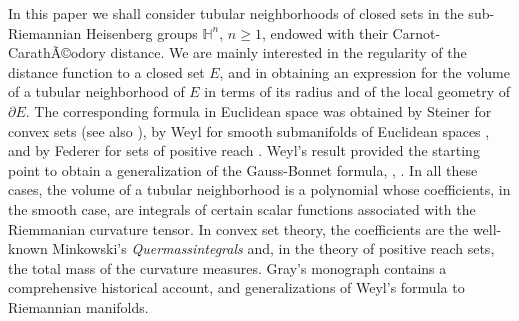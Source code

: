 \documentclass[10pt]{amsart}
\theoremstyle{definition}
\theoremstyle{remark}
\numberwithin{equation}{section}
\begin{document}
In this paper we shall consider tubular neighborhoods of closed sets in the sub-Rie\-ma\-nnian Heisenberg groups ${{\mathbb{H}}}^n$, $n{\geqslant} 1$, endowed with their Carnot-CarathÃ©odory distance. We are mainly interested in the regularity of the distance function to a closed set $E$, and in obtaining an expression for the volume of a tubular neighborhood of $E$ in terms of its radius and of the local geometry of ${\partial} E$. The corresponding formula in Euclidean space was obtained by Steiner for convex sets \cite{steiner} (see also \cite[\S~4.2]{MR3155183}), by Weyl for smooth submanifolds of Euclidean spaces \cite{MR1507388}, and by Federer for sets of positive reach \cite{MR0110078}. Weyl's result provided the starting point to obtain a generalization of the Gauss\--Bo\-nnet formula, \cite{zbMATH03098391}, \cite{zbMATH03098393}. In all these cases, the volume of a tubular neighborhood is a polynomial whose coefficients, in the smooth case, are integrals of certain scalar functions associated with the Riemmanian curvature tensor. In convex set theory, the coefficients are the well-known Minkowski's \emph{Quermassintegrals} and, in the theory of positive reach sets, the total mass of the curvature measures. Gray's monograph \cite{MR2024928} contains a comprehensive historical account, and generalizations of Weyl's formula to Riemannian manifolds.
\end{document}
